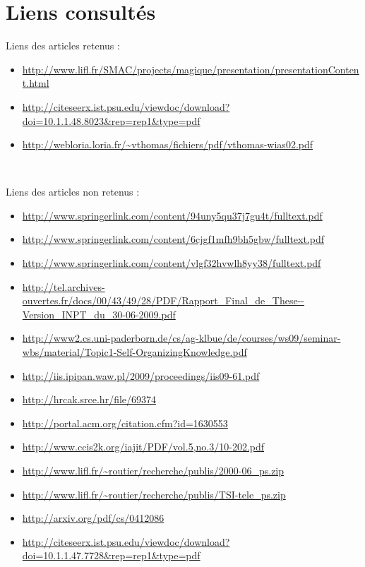 \section*{Liens consultés}
Liens des articles retenus :
\begin{small}
\begin{itemize}
\item \cite{m1} \url{http://www.lifl.fr/SMAC/projects/magique/presentation/presentationContent.html}
\item \cite{m2} \url{http://citeseerx.ist.psu.edu/viewdoc/download?doi=10.1.1.48.8023\&rep=rep1\&type=pdf}
\item \cite{spiders} \url{http://webloria.loria.fr/~vthomas/fichiers/pdf/vthomas-wias02.pdf}
\end{itemize}
  \end{small}
~

Liens des articles non retenus :
\begin{small}
\begin{itemize}
  \item \url{http://www.springerlink.com/content/94uny5qu37j7gu4t/fulltext.pdf}
  \item \url{http://www.springerlink.com/content/6cjgf1mfh9bh5gbw/fulltext.pdf}
  \item \url{http://www.springerlink.com/content/vlgf32hvwlh8yy38/fulltext.pdf}
  \item \url{http://tel.archives-ouvertes.fr/docs/00/43/49/28/PDF/Rapport_Final_de_These--Version_INPT_du_30-06-2009.pdf}
  \item \url{http://www2.cs.uni-paderborn.de/cs/ag-klbue/de/courses/ws09/seminar-wbs/material/Topic1-Self-OrganizingKnowledge.pdf}
  \item \url{http://iis.ipipan.waw.pl/2009/proceedings/iis09-61.pdf}
  \item \url{http://hrcak.srce.hr/file/69374}
  \item \url{http://portal.acm.org/citation.cfm?id=1630553}
  \item \url{http://www.ccis2k.org/iajit/PDF/vol.5,no.3/10-202.pdf}
  \item \url{http://www.lifl.fr/~routier/recherche/publis/2000-06\_ps.zip}
  \item \url{http://www.lifl.fr/~routier/recherche/publis/TSI-tele\_ps.zip}
  \item \url{http://arxiv.org/pdf/cs/0412086}
  \item \url{http://citeseerx.ist.psu.edu/viewdoc/download?doi=10.1.1.47.7728\&rep=rep1\&type=pdf}

\end{itemize}
\end{small}


